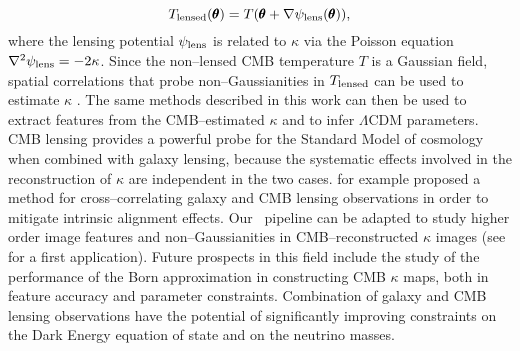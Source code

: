 \begin{equation}
\label{eq:8:tlens}
T_{\rm lensed}(\pmb{\theta}) = T(\pmb{\theta} + \nabla \psi_{\rm lens}(\pmb{\theta})),
\end{equation} 
%
where the lensing potential $\psi_{\rm lens}$ is related to $\kappa$ via the Poisson equation $\nabla^2\psi_{\rm lens}=-2\kappa$. Since the non--lensed CMB temperature $T$ is a Gaussian field, spatial correlations that probe non--Gaussianities in $T_{\rm lensed}$ can be used to estimate $\kappa$ \citep{CMBLens,HuCMBLens}. The same methods described in this work can then be used to extract features from the CMB--estimated $\kappa$ and to infer $\Lambda$CDM parameters. CMB lensing provides a powerful probe for the Standard Model of cosmology when combined with galaxy lensing, because the systematic effects involved in the reconstruction of $\kappa$ are independent in the two cases. \citep{CMBIA} for example proposed a method for cross--correlating galaxy and CMB lensing observations in order to mitigate intrinsic alignment effects. Our \LT\, pipeline can be adapted to study higher order image features and non--Gaussianities in CMB--reconstructed $\kappa$ images (see \citep{PetriCMB} for a first application). Future prospects in this field include the study of the performance of the Born approximation in constructing CMB $\kappa$ maps, both in feature accuracy \citep{CMBCalabrese,CMBPrattenLewis} and parameter constraints. Combination of galaxy and CMB lensing observations have the potential of significantly improving constraints on the Dark Energy equation of state and on the neutrino masses.   


%
